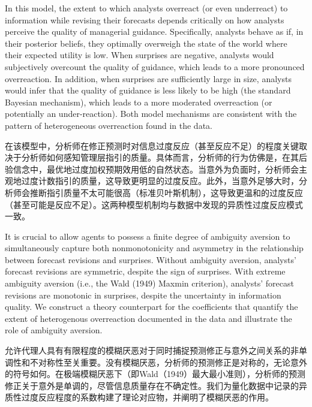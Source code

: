 \documentclass[12pt,a4paper]{article}
\newenvironment{original}
  {\par\medskip\noindent\ignorespaces}
  {\par\medskip}
\newenvironment{translation}
  {\par\noindent{\color{transblue}\ignorespaces}}
  {\par\bigskip}
\begin{document}
\begin{original}
In this model, the extent to which analysts overreact (or even underreact) to information while revising their forecasts depends critically on how analysts perceive the quality of managerial guidance. Specifically, analysts behave as if, in their posterior beliefs, they optimally overweigh the state of the world where their expected utility is low. When surprises are negative, analysts would subjectively overcount the quality of guidance, which leads to a more pronounced overreaction. In addition, when surprises are sufficiently large in size, analysts would infer that the quality of guidance is less likely to be high (the standard Bayesian mechanism), which leads to a more moderated overreaction (or potentially an under-reaction). Both model mechanisms are consistent with the pattern of heterogeneous overreaction found in the data.
\end{original}
\begin{translation}
在该模型中，分析师在修正预测时对信息过度反应（甚至反应不足）的程度关键取决于分析师如何感知管理层指引的质量。具体而言，分析师的行为仿佛是，在其后验信念中，最优地过度加权预期效用低的自然状态。当意外为负面时，分析师会主观地过度计数指引的质量，这导致更明显的过度反应。此外，当意外足够大时，分析师会推断指引质量不太可能很高（标准贝叶斯机制），这导致更温和的过度反应（甚至可能是反应不足）。这两种模型机制均与数据中发现的异质性过度反应模式一致。
\end{translation}

\begin{original}
It is crucial to allow agents to possess a finite degree of ambiguity aversion to simultaneously capture both nonmonotonicity and asymmetry in the relationship between forecast revisions and surprises. Without ambiguity aversion, analysts' forecast revisions are symmetric, despite the sign of surprises. With extreme ambiguity aversion (i.e., the Wald (1949) Maxmin criterion), analysts' forecast revisions are monotonic in surprises, despite the uncertainty in information quality. We construct a theory counterpart for the coefficients that quantify the extent of heterogenous overreaction documented in the data and illustrate the role of ambiguity aversion.
\end{original}
\begin{translation}
允许代理人具有有限程度的模糊厌恶对于同时捕捉预测修正与意外之间关系的非单调性和不对称性至关重要。没有模糊厌恶，分析师的预测修正是对称的，无论意外的符号如何。在极端模糊厌恶下（即Wald（1949）最大最小准则），分析师的预测修正关于意外是单调的，尽管信息质量存在不确定性。我们为量化数据中记录的异质性过度反应程度的系数构建了理论对应物，并阐明了模糊厌恶的作用。
\end{translation}
\end{document}
